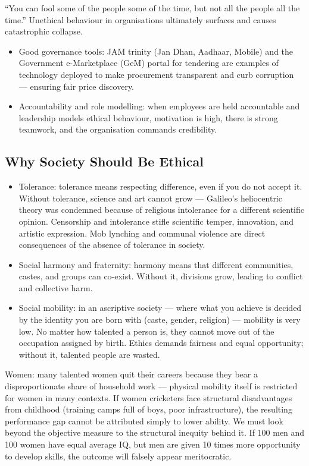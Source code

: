 \begin{CriticalPoint}
``You can fool some of the people some of the time, but not all the people all the time.'' Unethical behaviour in organisations ultimately surfaces and causes catastrophic collapse.
\end{CriticalPoint}

\begin{itemize}
\item Good governance tools: JAM trinity (Jan Dhan, Aadhaar, Mobile) and the Government e-Marketplace (GeM) portal for tendering are examples of technology deployed to make procurement transparent and curb corruption --- ensuring fair price discovery.
\item Accountability and role modelling: when employees are held accountable and leadership models ethical behaviour, motivation is high, there is strong teamwork, and the organisation commands credibility.
\end{itemize}

\subsection{Why Society Should Be Ethical}

\begin{itemize}
\item Tolerance: tolerance means respecting difference, even if you do not accept it. Without tolerance, science and art cannot grow --- Galileo's heliocentric theory was condemned because of religious intolerance for a different scientific opinion. Censorship and intolerance stifle scientific temper, innovation, and artistic expression. Mob lynching and communal violence are direct consequences of the absence of tolerance in society.
\item Social harmony and fraternity: harmony means that different communities, castes, and groups can co-exist. Without it, divisions grow, leading to conflict and collective harm.
\item Social mobility: in an ascriptive society --- where what you achieve is decided by the identity you are born with (caste, gender, religion) --- mobility is very low. No matter how talented a person is, they cannot move out of the occupation assigned by birth. Ethics demands fairness and equal opportunity; without it, talented people are wasted.
\end{itemize}

\begin{ExampleBox}
Women: many talented women quit their careers because they bear a disproportionate share of household work --- physical mobility itself is restricted for women in many contexts. If women cricketers face structural disadvantages from childhood (training camps full of boys, poor infrastructure), the resulting performance gap cannot be attributed simply to lower ability. We must look beyond the objective measure to the structural inequity behind it. If 100 men and 100 women have equal average IQ, but men are given 10 times more opportunity to develop skills, the outcome will falsely appear meritocratic.
\end{ExampleBox}

